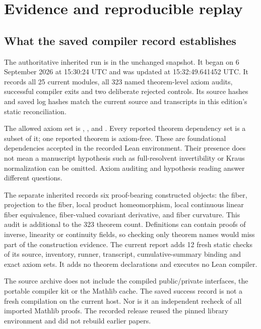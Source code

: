 \section{Evidence and reproducible replay}
\label{sec:replay}

\subsection{What the saved compiler record establishes}
The authoritative inherited run is  in the unchanged snapshot. It began on 6 September 2026 at 15:30:24 UTC and was updated at 15:32:49.641452 UTC. It records all 25 current modules, all 323 named theorem-level axiom audits, successful compiler exits and two deliberate rejected controls. Its source hashes and saved log hashes match the current source and transcripts in this edition's static reconciliation.

The allowed axiom set is , , and . Every reported theorem dependency set is a subset of it; one reported theorem is axiom-free. These are foundational dependencies accepted in the recorded Lean environment. Their presence does not mean a manuscript hypothesis such as full-resolvent invertibility or Kraus normalization can be omitted. Axiom auditing and hypothesis reading answer different questions.

The separate inherited  records six proof-bearing constructed objects: the fiber, projection to the fiber, local product homeomorphism, local continuous linear fiber equivalence, fiber-valued covariant derivative, and fiber curvature. This audit is additional to the 323 theorem count. Definitions can contain proofs of inverse, linearity or continuity fields, so checking only theorem names would miss part of the construction evidence. The current  report adds 12 fresh static checks of its source, inventory, runner, transcript, cumulative-summary binding and exact axiom sets. It adds no theorem declarations and executes no Lean compiler.

The source archive does not include the compiled public/private interfaces, the portable compiler kit or the Mathlib cache. The saved success record is not a fresh compilation on the current host. Nor is it an independent recheck of all imported Mathlib proofs. The recorded release reused the pinned library environment and did not rebuild earlier papers.

